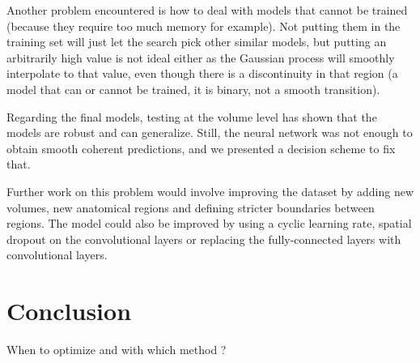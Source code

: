 Another problem encountered is how to deal with models that cannot be trained (because they require too much memory for example). Not putting them in the training set will just let the search pick other similar models, but putting an arbitrarily high value is not ideal either as the Gaussian process will smoothly interpolate to that value, even though there is a discontinuity in that region (a model that can or cannot be trained, it is binary, not a smooth transition).

Regarding the final models, testing at the volume level has shown that the models are robust and can generalize. Still, the neural network was not enough to obtain smooth coherent predictions, and we presented a decision scheme to fix that.

Further work on this problem would involve improving the dataset by adding new volumes, new anatomical regions and defining stricter boundaries between regions. The model could also be improved by using a cyclic learning rate, spatial dropout on the convolutional layers or replacing the fully-connected layers with convolutional layers.

\section{Conclusion}

When to optimize and with which method ?
